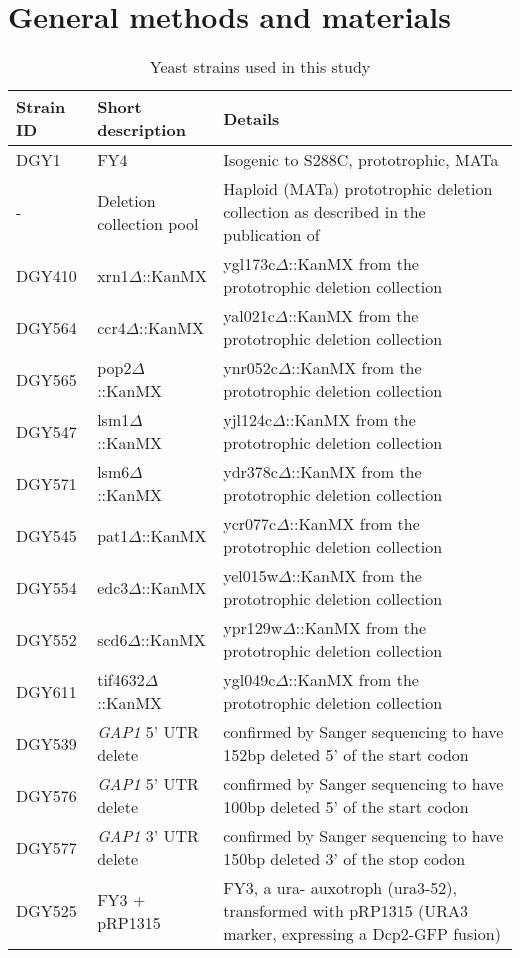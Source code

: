 {\section{General methods and materials}



\begin{table}%
\caption{Yeast strains used in this study}
\label{tab:strainsTable}
\begin{tabular}{l l p{}}
\toprule
Strain ID & Short description & Details \\
\midrule
DGY1 & FY4 & Isogenic to S288C, prototrophic, MATa \\
- & Deletion collection pool & Haploid (MATa) prototrophic deletion
collection as described in the publication of
\cite{vandersluis2014broad}\\
DGY410 &xrn1$\Delta$::KanMX &   ygl173c$\Delta$::KanMX from the prototrophic deletion collection \\
DGY564 &ccr4$\Delta$::KanMX &   yal021c$\Delta$::KanMX from the prototrophic deletion collection \\
DGY565 &pop2$\Delta$::KanMX &   ynr052c$\Delta$::KanMX from the prototrophic deletion collection \\
DGY547 &lsm1$\Delta$::KanMX &   yjl124c$\Delta$::KanMX from the prototrophic deletion collection \\
DGY571 &lsm6$\Delta$::KanMX &   ydr378c$\Delta$::KanMX from the prototrophic deletion collection \\
DGY545 &pat1$\Delta$::KanMX &   ycr077c$\Delta$::KanMX from the prototrophic deletion collection \\
DGY554 &edc3$\Delta$::KanMX &   yel015w$\Delta$::KanMX from the prototrophic deletion collection \\
DGY552 &scd6$\Delta$::KanMX &   ypr129w$\Delta$::KanMX from the prototrophic deletion collection \\
DGY611 &tif4632$\Delta$::KanMX &   ygl049c$\Delta$::KanMX from the prototrophic deletion collection \\
DGY539 & \textit{GAP1} 5' UTR delete & confirmed by Sanger sequencing to have 152bp deleted 5' of the start codon \\
DGY576 & \textit{GAP1} 5' UTR delete & confirmed by Sanger sequencing to have 100bp deleted 5' of the start codon \\
DGY577 & \textit{GAP1} 3' UTR delete & confirmed by Sanger sequencing to have 150bp deleted 3' of the stop codon \\
DGY525 & FY3 + pRP1315 & FY3, a ura- auxotroph (ura3-52), transformed with pRP1315 (URA3 marker, expressing a Dcp2-GFP fusion) \\
\bottomrule
\end{tabular}
\end{table}

}
